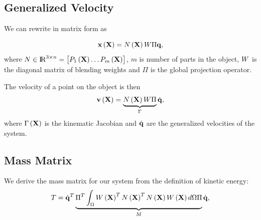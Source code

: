 \subsection{Generalized Velocity}

We can rewrite  in matrix form as 

\begin{equation}
    \mathbf{x}\left(\mathbf{X}\right) = N\left(\mathbf{X}\right)W\Pi\mathbf{q},
\end{equation} where $N\in{\rm I\!R}^{3\times n} = \begin{bmatrix}P_1\left(\mathbf{X}\right) \dots P_m\left(\mathbf{X}\right)\end{bmatrix}$, $m$ is number of 
parts in the object, $W$ is the diagonal matrix of blending weights and $\Pi$ is the global projection operator.

The velocity of a point on the object is then  
\begin{equation}
        \mathbf{v}\left(\mathbf{X}\right) = \underbrace{N\left(\mathbf{X}\right)W\Pi}_{\Gamma}\dot{\mathbf{q}},
    \end{equation} where $\Gamma\left(\mathbf{X}\right)$ is the kinematic Jacobian and $\dot{\mathbf{q}}$ are the generalized velocities of the system.

\subsection{Mass Matrix}
\label{ssec:mass_matrix}

We derive the mass matrix for our system from the definition of kinetic energy:
\begin{equation}
    T = \dot{\mathbf{q}}^T\underbrace{\Pi^T\int_{\Omega}W\left(\mathbf{X}\right)^TN\left(\mathbf{X}\right)^TN\left(\mathbf{X}\right)W\left(\mathbf{X}\right)d\Omega\Pi}_{M}\dot{\mathbf{q}},
\end{equation}


